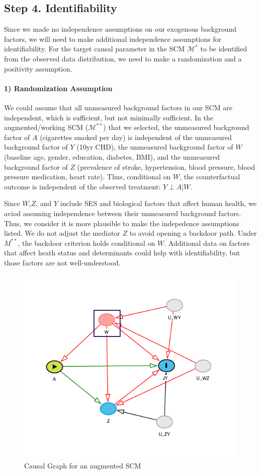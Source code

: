 \documentclass[]{article}
\let\oldparagraph\paragraph
\renewcommand{\paragraph}[1]{\oldparagraph{#1}\mbox{}}
\begin{document}
\subsection{Step 4. Identifiability}\label{step-4.-identifiability}

Since we made no independence assumptions on our exogenous background
factors, we will need to make additional independence assumptions for
identifiability. For the target causal parameter in the SCM
\(\mathcal{M^*}\) to be identified from the observed data distribution,
we need to make a randomization and a positivity assumption.

\paragraph{1) Randomization Assumption}\label{randomization-assumption}

We could assume that all unmeasured background factors in our SCM are
independent, which is sufficient, but not minimally sufficient. In the
augmented/working SCM (\(\mathcal{M^{**}}\)) that we selected, the
unmeasured background factor of \(A\) (cigarettes smoked per day) is
independent of the unmeasured background factor of \(Y\) (10yr CHD), the
unmeasured background factor of \(W\) (baseline age, gender, education,
diabetes, BMI), and the unmeasured background factor of \(Z\)
(prevalence of stroke, hypertension, blood pressure, blood pressure
medication, heart rate). Thus, conditional on \(W\), the counterfactual
outcome is independent of the observed treatment: \(Y \perp A|W\).

Since \(W\),\(Z\), and \(Y\) include SES and biological factors that
affect human health, we aviod assuming independence between their
unmeasured background factors. Thus, we consider it is more plausible to
make the indepedence assumptions listed. We do not adjust the mediator
\(Z\) to avoid opening a backdoor path. Under \(M^{**}\), the backdoor
criterion holds conditional on \(W\). Additional data on factors that
affect heath status and determinants could help with identifiability,
but those factors are not well-understood.

\begin{figure}[H]

{\centering \includegraphics[width=0.65\linewidth]{./dags/augmented_dag} 

}

\caption{Causal Graph for an augmented SCM}\label{fig:fig2}
\end{figure}
\end{document}
